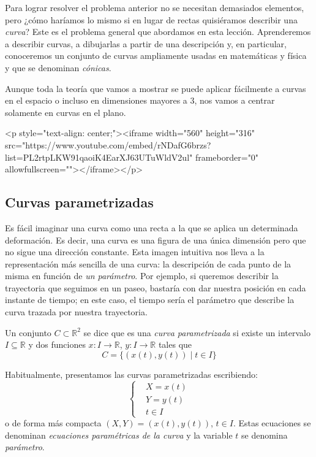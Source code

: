 Para lograr resolver el problema anterior no se necesitan demasiados elementos, pero ¿cómo haríamos lo mismo si en lugar de rectas quisiéramos describir
una \emph{curva}? Este es el problema general que abordamos en esta lección.
Aprenderemos a describir curvas, a dibujarlas a partir de una descripción y, en particular, conoceremos un conjunto de curvas ampliamente usadas en matemáticas y física y que se denominan \emph{cónicas}.

Aunque toda la teoría que vamos a mostrar se puede aplicar fácilmente a curvas en el espacio o incluso en dimensiones mayores a 3, nos vamos a centrar solamente en curvas en el plano.

\begin{rawhtml}
<p style="text-align: center;"><iframe width="560" height="316" src="https://www.youtube.com/embed/rNDafG6brzs?list=PL2rtpLKW91qaoiK4EarXJ63UTuWldV2ul" frameborder="0" allowfullscreen=""></iframe></p>
\end{rawhtml}

\subsection{Curvas parametrizadas}

Es fácil imaginar una curva como una recta a la que se aplica un determinada deformación. Es decir, una curva es una figura de una única dimensión pero que no sigue una dirección constante.
Esta imagen intuitiva nos lleva a la representación más sencilla de una curva: la descripción de cada punto de la misma en función de \emph{un parámetro}.
Por ejemplo, si queremos describir la trayectoria que seguimos en un paseo, bastaría con dar nuestra posición en cada instante de tiempo; en este caso, el tiempo sería el parámetro que describe la curva trazada por nuestra trayectoria.

\begin{definicion} Un conjunto $C\subset\mathbb{R}^2$ se dice que es una \emph{curva parametrizada} si existe un intervalo $I\subseteq \mathbb{R}$ y dos funciones $x\colon I\to \mathbb{R}$, $y\colon I\to \mathbb{R}$ tales que
\[
C=\{(x(t),y(t)) \mid t\in I\}
\]
\end{definicion}

Habitualmente, presentamos las curvas parametrizadas escribiendo:
\[
\begin{cases}
& X = x(t)\\
& Y = y(t)\\
& t\in I
\end{cases}
\]
o de forma más compacta $(X,Y)=(x(t),y(t))$, $t\in I$. Estas ecuaciones se denominan \emph{ecuaciones paramétricas de la curva} y la variable $t$ se
denomina \emph{parámetro}.

